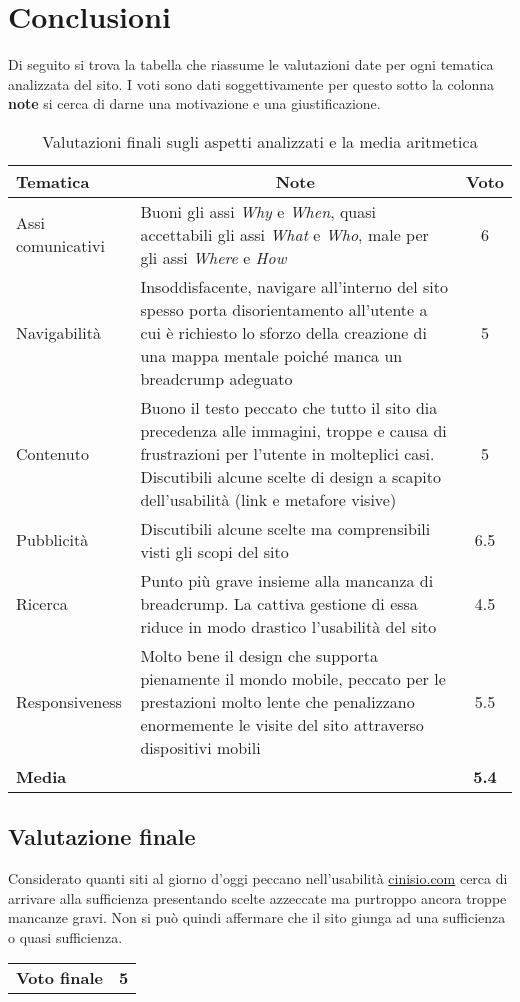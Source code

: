 
\section{Conclusioni}
	Di seguito si trova la tabella che riassume le valutazioni date per ogni tematica analizzata del sito. I voti sono dati soggettivamente per questo sotto la colonna \textbf{note} si cerca di darne una motivazione e una giustificazione.
	

	\begin{table} [h]
		\centering
		\begin{tabularx}{\textwidth}{lXc}
			\toprule
			\textbf{Tematica} & \multicolumn{1}{c}{\textbf{Note}} & \textbf{Voto} \\
			\toprule
			Assi comunicativi & Buoni gli assi \textit{Why} e \textit{When}, quasi accettabili gli assi \textit{What} e \textit{Who}, male per gli assi \textit{Where} e \textit{How} & 6 \\
			\midrule
			Navigabilità & Insoddisfacente, navigare all'interno del sito spesso porta disorientamento all'utente a cui è richiesto lo sforzo della creazione di una mappa mentale poiché manca un breadcrump adeguato & 5 \\
			\midrule
			Contenuto & Buono il testo peccato che tutto il sito dia precedenza alle immagini, troppe e causa di frustrazioni per l'utente in molteplici casi. Discutibili alcune scelte di design a scapito dell'usabilità (link e metafore visive) & 5 \\
			\midrule
			Pubblicità & Discutibili alcune scelte ma comprensibili visti gli scopi del sito & 6.5 \\
			\midrule
			Ricerca & Punto più grave insieme alla mancanza di breadcrump. La cattiva gestione di essa riduce in modo drastico l'usabilità del sito  & 4.5 \\
			\midrule
			Responsiveness & Molto bene il design che supporta pienamente il mondo mobile, peccato per le prestazioni molto lente che penalizzano enormemente le visite del sito attraverso dispositivi mobili & 5.5 \\
			\midrule
			\textbf{Media} & & \textbf{5.4} \\
			\midrule
		\end{tabularx}
		\caption{Valutazioni finali sugli aspetti analizzati e la media aritmetica}
		\label{tab:ValutazioniFinali}
	\end{table}
	
	\subsection{Valutazione finale} 
		Considerato quanti siti al giorno d'oggi peccano nell'usabilità \href{http://www.cinisio.com/}{cinisio.com} cerca di arrivare alla sufficienza presentando scelte azzeccate ma purtroppo ancora troppe mancanze gravi. Non si può quindi affermare che il sito giunga ad una sufficienza o quasi sufficienza.
		
		\begin{center}
		\begin{tabular}{c|r}
			\textbf{Voto finale} & \textbf{5} \\
		\end{tabular}
		\end{center}
		
